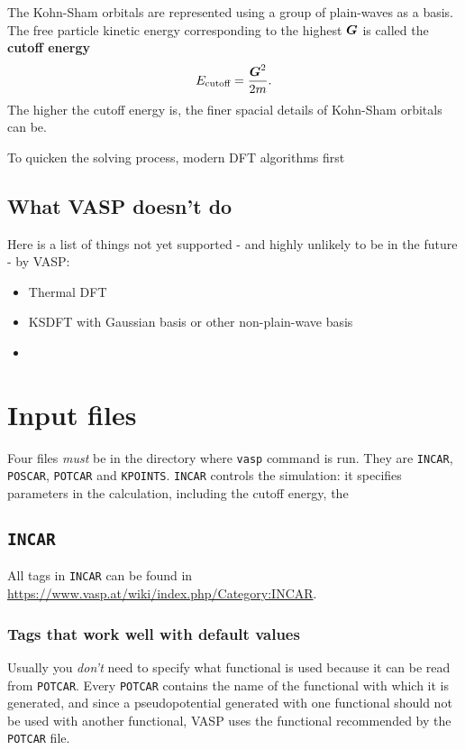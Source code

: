 \documentclass[hyperref, a4paper]{article}
\newcommand*{\concept}[1]{{\textbf{#1}}}
\begin{document}
The Kohn-Sham orbitals are represented using a group of plain-waves as a basis.
The free particle kinetic energy corresponding to the highest $\vb*{G}$ is called the \concept{cutoff energy}
\begin{equation}
    E_\text{cutoff} = \frac{\vb*{G}^2}{2m}.
\end{equation}
The higher the cutoff energy is, the finer spacial details of Kohn-Sham orbitals can be.

To quicken the solving process, modern DFT algorithms first 



\subsection{What VASP doesn't do}

Here is a list of things not yet supported - and highly unlikely to be in the future - by VASP:
\begin{itemize}
    \item Thermal DFT
    \item KSDFT with Gaussian basis or other non-plain-wave basis
    \item 
\end{itemize}

\section{Input files}

Four files \emph{must} be in the directory where \texttt{vasp} command is run. They are \texttt{INCAR}, \texttt{POSCAR}, \texttt{POTCAR} and \texttt{KPOINTS}.
\texttt{INCAR} controls the simulation: it specifies parameters in the calculation, including the cutoff energy, the 

\subsection{\texttt{INCAR}}

All tags in \texttt{INCAR} can be found in \url{https://www.vasp.at/wiki/index.php/Category:INCAR}.

\subsubsection{Tags that work well with default values}

Usually you \emph{don't} need to specify what functional is used because it can be read from \texttt{POTCAR}.
Every \texttt{POTCAR} contains the name of the functional with which it is generated, and since a pseudopotential generated with one functional should not be used with another functional, VASP uses the functional recommended by the \texttt{POTCAR} file.
\end{document}

